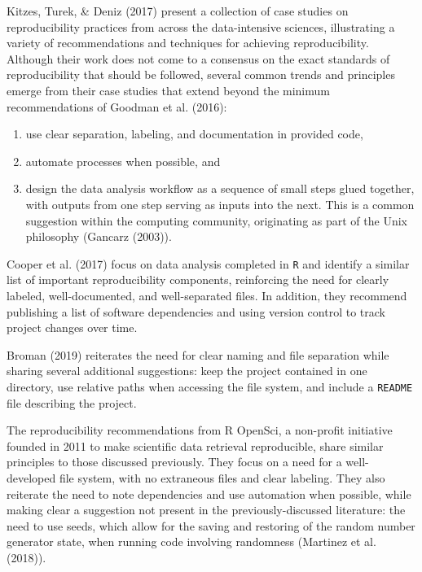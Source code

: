 \documentclass[12pt,twoside]{reedthesis}
\providecommand{\tightlist}{%
  \setlength{\itemsep}{0pt}\setlength{\parskip}{0pt}}
\begin{document}
Kitzes, Turek, \& Deniz (2017) present a collection of case studies on
reproducibility practices from across the data-intensive sciences,
illustrating a variety of recommendations and techniques for achieving
reproducibility. Although their work does not come to a consensus on the
exact standards of reproducibility that should be followed, several
common trends and principles emerge from their case studies that extend
beyond the minimum recommendations of Goodman et al. (2016):
\begin{enumerate}
\def\labelenumi{\arabic{enumi})}
\tightlist
\item
  use clear separation, labeling, and documentation in provided code,
\item
  automate processes when possible, and
\item
  design the data analysis workflow as a sequence of small steps glued
  together, with outputs from one step serving as inputs into the next.
  This is a common suggestion within the computing community,
  originating as part of the Unix philosophy (Gancarz (2003)).
\end{enumerate}
Cooper et al. (2017) focus on data analysis completed in \texttt{R} and
identify a similar list of important reproducibility components,
reinforcing the need for clearly labeled, well-documented, and
well-separated files. In addition, they recommend publishing a list of
software dependencies and using version control to track project changes
over time.

Broman (2019) reiterates the need for clear naming and file separation
while sharing several additional suggestions: keep the project contained
in one directory, use relative paths when accessing the file system, and
include a \texttt{README} file describing the project.

The reproducibility recommendations from R OpenSci, a non-profit
initiative founded in 2011 to make scientific data retrieval
reproducible, share similar principles to those discussed previously.
They focus on a need for a well-developed file system, with no
extraneous files and clear labeling. They also reiterate the need to
note dependencies and use automation when possible, while making clear a
suggestion not present in the previously-discussed literature: the need
to use seeds, which allow for the saving and restoring of the random
number generator state, when running code involving randomness (Martinez
et al. (2018)).
\end{document}
